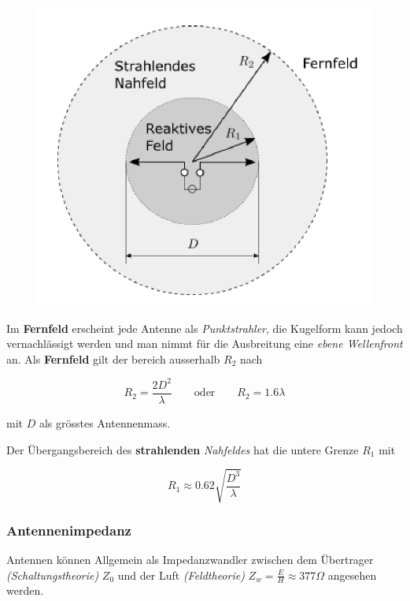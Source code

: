 \documentclass[
  10pt,
  a4paper,
  german]{article}
\numberwithin{equation}{section}
\begin{document}
\begin{figure}[H]

{\centering \includegraphics{images/04_Fernfeld.png}

}

\end{figure}

Im \textbf{Fernfeld} erscheint jede Antenne als \emph{Punktstrahler},
die Kugelform kann jedoch vernachlässigt werden und man nimmt für die
Ausbreitung eine \emph{ebene Wellenfront} an. Als \textbf{Fernfeld} gilt
der bereich ausserhalb \(R_2\) nach

\[
R_2=\frac{2D^2}{\lambda}\qquad\text{oder}\qquad R_2=1.6\lambda
\]

mit \(D\) als grösstes Antennenmass.

Der Übergangsbereich des \textbf{strahlenden} \emph{Nahfeldes} hat die
untere Grenze \(R_1\) mit

\[
R_1\approx 0.62\sqrt{\frac{D^3}{\lambda}}
\]

\hypertarget{antennenimpedanz}{%
\subsubsection{Antennenimpedanz}\label{antennenimpedanz}}

Antennen können Allgemein als Impedanzwandler zwischen dem Übertrager
\emph{(Schaltungstheorie)} \(Z_0\) und der Luft \emph{(Feldtheorie)}
\(Z_w=\frac{E}{H}\approx 377\Omega\) angesehen werden.
\end{document}
